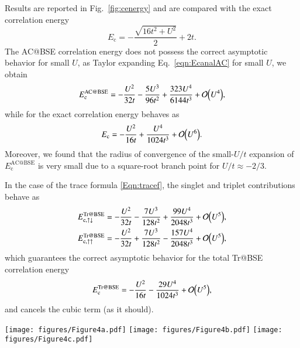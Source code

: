 \documentclass[aps,prb,reprint,superscriptaddress]{revtex4-1}
\makeatletter
\newcommand{\singlet}{\uparrow\downarrow}
\newcommand{\triplet}{\uparrow\uparrow}
\newcommand{\Ec}{E_\text{c}}
\newcommand{\EcTr}[1]{E_{\text{c},#1}^\text{Tr@BSE}}
\newcommand{\EcTrBSE}{E_\text{c}^\text{Tr@BSE}}
\newcommand{\EcACBSE}{E_\text{c}^\text{AC@BSE}}
\makeatother
\begin{document}
Results are reported in Fig.~\ref{fig:cenergy} and are compared with the exact correlation energy \citep{Romaniello_2009a}
\begin{equation}
	\Ec = - \frac{\sqrt{16 t^2 + U^2}}{2} + 2t.
\end{equation}
The AC@BSE correlation energy does not possess the correct asymptotic behavior for small $U$, as Taylor expanding Eq.~\eqref{eqn:EcanalAC} for small $U$, we obtain 
\begin{equation}
	\EcACBSE = -\frac{U^2}{32t} - \frac{5U^3}{96t^2} + \frac{323 U^4}{6144t^3} + \order{U^4},
\end{equation}
while for the exact correlation energy behaves as
\begin{equation}
	\Ec = - \frac{U^2}{16t} + \frac{U^4}{1024t^3} + \order{U^6}.
\end{equation}
Moreover, we found that the radius of convergence of the small-$U/t$ expansion of $\EcACBSE$ is very small due to a square-root branch point for $U/t \approx -2/3$.

In the case of the trace formula \eqref{Eqn:tracef}, the singlet and triplet contributions behave as
\begin{subequations}
\begin{align}
	\EcTr{\singlet} & = - \frac{U^2}{32t} - \frac{7U^3}{128t^2} + \frac{99U^4}{2048t^3} + \order{U^5},
	\\
	\EcTr{\triplet} & = - \frac{U^2}{32t} + \frac{7U^3}{128t^2} - \frac{157U^4}{2048t^3} + \order{U^5},
\end{align} 
\end{subequations} 
which guarantees the correct asymptotic behavior for the total Tr@BSE correlation energy 
\begin{equation}
	\EcTrBSE = - \frac{U^2}{16t} - \frac{29U^4}{1024t^3} + \order{U^5},
\end{equation}
and cancels the cubic term (as it should).



\begin{figure*}
	\texttt{[image: figures/Figure4a.pdf]}
    \texttt{[image: figures/Figure4b.pdf]}
    \texttt{[image: figures/Figure4c.pdf]}
 \caption{Real and imaginary parts of the BSE@$G_\text{HF}W_\text{HF}$ correlation energy as a function of $U/t$ at various levels of theory: total (dotted blue line) and singlet-only (dashed green line) Tr@BSE, AC@BSE (dot-dashed magenta line), RPA (triple-dotted orange line), GM (double-dot-dashed red line), and exact (solid black line). For comparison also the BSE@exact (Tr@BSE, double-dotted dark grey line ; AC@BSE, dot-dashed light grey line) correlation energies are shown. Discontinuities in the first derivative of the energy (corresponding to the appearance of complex poles) are indicated by open circles.}
\label{fig:cenergy}
\end{figure*}
\end{document}
